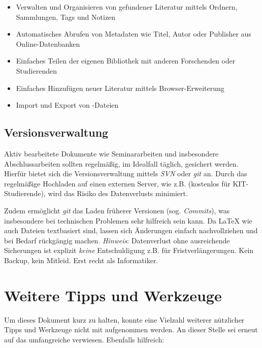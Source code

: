 \smallskip
\begin{itemize}
    \item Verwalten und Organisieren von gefundener Literatur mittels Ordnern, Sammlungen, Tags und Notizen
    \item Automatisches Abrufen von Metadaten wie Titel, Autor oder Publisher aus Online-Datenbanken
    \item Einfaches Teilen der eigenen Bibliothek mit anderen Forschenden oder Studierenden
    \item Einfaches Hinzufügen neuer Literatur mittels Browser-Erweiterung
    \item Import und Export von \bibtex-Dateien
\end{itemize}

\subsection{Versionsverwaltung}%
\label{sec:Verwalten:Version}

Aktiv bearbeitete Dokumente wie Seminararbeiten und insbesondere Abschlussarbeiten sollten regelmäßig, im Idealfall täglich, gesichert werden.
Hierfür bietet sich die Versionsverwaltung mittels \emph{SVN} oder \emph{git} an.
Durch das regelmäßige Hochladen auf einen externen Server, wie z.B.  (kostenlos für KIT-Studierende), wird das Risiko des Datenverlusts minimiert.

Zudem ermöglicht \emph{git} das Laden früherer Versionen (sog. \emph{Commits}), was insbesondere bei technischen Problemen sehr hilfreich sein kann.
Da \LaTeX\- wie auch \bibtex\-Dateien textbasiert sind, lassen sich Änderungen einfach nachvollziehen und bei Bedarf rückgängig machen.
\emph{Hinweis}: Datenverlust ohne ausreichende Sicherungen ist explizit \emph{keine} Entschuldigung z.B. für Fristverlängerungen.
Kein Backup, kein Mitleid.
Erst recht als Informatiker.

\section{Weitere Tipps und Werkzeuge}%
\label{sec:Tipps}

Um dieses Dokument kurz zu halten, konnte eine Vielzahl weiterer nützlicher Tipps und Werkzeuge nicht mit aufgenommen werden. 
An dieser Stelle sei erneut auf das umfangreiche  verwiesen. 
Ebenfalls hilfreich:

